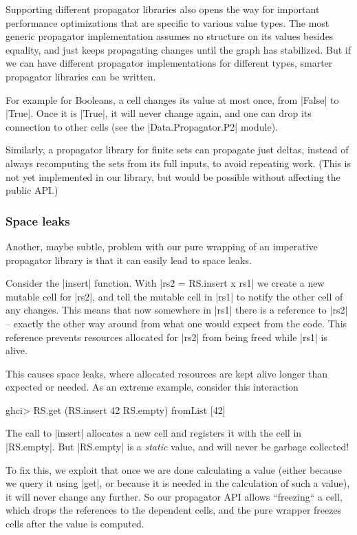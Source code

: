 \documentclass[manuscript,review,screen,acmsmall]{acmart}
\begin{document}
Supporting different propagator libraries also opens the way for important performance optimizations that are specific to various value types. The most generic propagator implementation assumes no structure on its values besides equality, and just keeps propagating changes until the graph has stabilized. But if we can have different propagator implementations for different types, smarter propagator libraries can be written.

For example for Booleans, a cell changes its value at most once, from |False| to |True|. Once it is |True|, it will never change again, and one can drop its connection to other cells (see the |Data.Propagator.P2| module).

Similarly, a propagator library for finite sets can propagate just deltas, instead of always recomputing the sets from its full inputs, to avoid repeating work. (This is not yet implemented in our library, but would be possible without affecting the public API.)

\subsubsection{Space leaks}\label{sec:spaceleak}

Another, maybe subtle, problem with our pure wrapping of an imperative propagator library is that it can easily lead to space leaks.

Consider the |insert| function. With |rs2 = RS.insert x rs1| we create a new mutable cell for |rs2|, and tell the mutable cell in |rs1| to notify the other cell of any changes. This means that now somewhere in |rs1| there is a reference to |rs2| -- exactly the other way around from what one would expect from the code. This reference prevents resources allocated for |rs2| from being freed while |rs1| is alive.

This causes space leaks, where allocated resources are kept alive longer than expected or needed. As an extreme example, consider this interaction
\begin{code}
ghci> RS.get (RS.insert 42 RS.empty)
fromList [42]
\end{code}
The call to |insert| allocates a new cell and registers it with the cell in |RS.empty|. But |RS.empty| is a \emph{static} value, and will never be garbage collected!

To fix this, we exploit that once we are done calculating a value (either because we query it using |get|, or because it is needed in the calculation of such a value), it will never change any further. So our propagator API allows “freezing“ a cell, which drops the references to the dependent cells, and the pure wrapper freezes cells after the value is computed.
\end{document}
